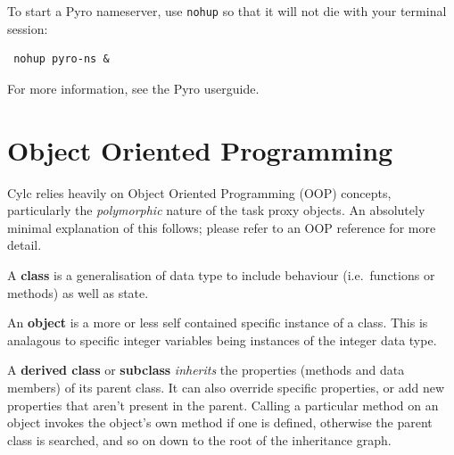 \documentclass[11pt,a4paper]{article}
\begin{document}
To start a Pyro nameserver, use \lstinline{nohup} so that it
will not die with your terminal session: 

\begin{lstlisting}
 nohup pyro-ns &
\end{lstlisting}

For more information, see the Pyro userguide.


\section{Object Oriented Programming}
\label{ObjectOrientedProgramming}

Cylc relies heavily on Object Oriented Programming (OOP) concepts,
particularly the {\em polymorphic} nature of the task proxy objects.
An absolutely minimal explanation of this follows; 
please refer to an OOP reference for more detail.

A {\bf class} is a generalisation of data type to include behaviour
(i.e.\ functions or methods) as well as state. 


An {\bf object} is a more or less self contained specific instance
of a class. This is analagous to specific integer variables being 
instances of the integer data type.

A {\bf derived class} or {\bf subclass} {\em inherits} the properties
(methods and data members) of its parent class. It can also override
specific properties, or add new properties that aren't present in the
parent. Calling a particular method on an object invokes the object's
own method if one is defined, otherwise the parent class is searched,
and so on down to the root of the inheritance graph. 

\end{document}
